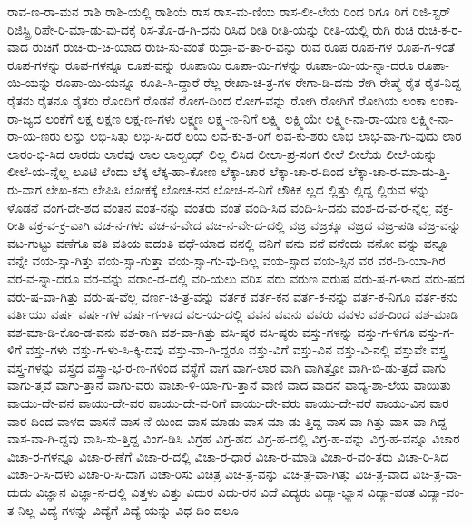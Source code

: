 {ರಾವ-ಣ-ರಾ-ಮನ
ರಾಶಿ
ರಾಶಿ-ಯಲ್ಲಿ
ರಾಶಿಯೆ
ರಾಸ
ರಾಸ-ಮ-ಣಿಯ
ರಾಸ-ಲೀ-ಲೆಯ
ರಿಂದ
ರಿಗೂ
ರಿಗೆ
ರಿಜಿ-ಸ್ಟರ್
ರಿಜಿಸ್ಟ್ರಿ
ರಿಪೇ-ರಿ-ಮಾ-ಡು-ವು-ದಕ್ಕೆ
ರಿಸ-ತೊ-ಡ-ಗಿ-ದನು
ರಿಸಿದ
ರೀತಿ
ರೀತಿ-ಯನ್ನು
ರೀತಿ-ಯಲ್ಲಿ
ರುಗಿ
ರುಚಿ
ರುಚಿ-ಕ-ರ-ವಾದ
ರುಚಿಗೆ
ರುಚಿ-ರು-ಚಿ-ಯಾದ
ರುಚಿ-ಸು-ವಂತೆ
ರುದ್ರಾ-ವ-ತಾ-ರ-ವನ್ನು
ರುವ
ರೂಪ
ರೂಪ-ಗಳ
ರೂಪ-ಗ-ಳಂತೆ
ರೂಪ-ಗಳನ್ನು
ರೂಪ-ಗಳನ್ನೂ
ರೂಪ-ವನ್ನು
ರೂಪಾಯಿ
ರೂಪಾ-ಯಿ-ಗಳನ್ನು
ರೂಪಾ-ಯಿ-ಯ-ನ್ನಾ-ದರೂ
ರೂಪಾ-ಯಿ-ಯನ್ನು
ರೂಪಾ-ಯಿ-ಯನ್ನೂ
ರೂಪಿ-ಸಿ-ದ್ದಾರೆ
ರೆಲ್ಲ
ರೇಖಾ-ಚಿ-ತ್ರ-ಗಳ
ರೇಗಾ-ಡಿ-ದನು
ರೇಗಿ
ರೇಷ್ಮೆ
ರೈತ
ರೈತ-ನಿದ್ದ
ರೈತನು
ರೈತನೂ
ರೈತರು
ರೊಂದಿಗೆ
ರೊಡನೆ
ರೋಗ-ದಿಂದ
ರೋಗ-ವನ್ನು
ರೋಗಿ
ರೋಗಿಗೆ
ರೋಗಿಯ
ಲಂಕಾ
ಲಂಕಾ-ರಾ-ಜ್ಯದ
ಲಂಕೆಗೆ
ಲಕ್ಷ
ಲಕ್ಷಣ
ಲಕ್ಷ-ಣ-ಗಳು
ಲಕ್ಷ್ಮಣ
ಲಕ್ಷ್ಮ-ಣ-ನಿಗೆ
ಲಕ್ಷ್ಮಿ
ಲಕ್ಷ್ಮಿಯೇ
ಲಕ್ಷ್ಮೀ-ನಾ-ರಾ-ಯಣ
ಲಕ್ಷ್ಮೀ-ನಾ-ರಾ-ಯ-ಣರು
ಲನ್ನು
ಲಭಿ-ಸಿತ್ತು
ಲಭಿ-ಸಿ-ದರೆ
ಲಯ
ಲವ-ಕು-ಶ-ರಿಗೆ
ಲವ-ಕು-ಶರು
ಲಾಭ
ಲಾಭ-ವಾ-ಗು-ವುದು
ಲಾರ
ಲಾರಂ-ಭಿ-ಸಿದ
ಲಾರದು
ಲಾರೆವು
ಲಾಲ
ಲಾಲ್ಬಂಧ್
ಲಿಲ್ಲ
ಲಿಸಿದ
ಲೀಲಾ-ಪ್ರ-ಸಂಗ
ಲೀಲೆ
ಲೀಲೆಯ
ಲೀಲೆ-ಯನ್ನು
ಲೀಲೆ-ಯ-ನ್ನೆಲ್ಲ
ಲೂಟಿ
ಲೆಂದು
ಲೆಕ್ಕ
ಲೆಕ್ಕ-ಹಾ-ಕೋಣ
ಲೆಕ್ಕಾ-ಚಾರ
ಲೆಕ್ಕಾ-ಚಾ-ರ-ದಿಂದ
ಲೆಕ್ಕಾ-ಚಾ-ರ-ಮಾ-ಡು-ತ್ತಿ-ರು-ವಾಗ
ಲೇಖ-ಕನು
ಲೇಪಿಸಿ
ಲೋಕಕ್ಕೆ
ಲೋಚ-ನನ
ಲೋಚ-ನ-ನಿಗೆ
ಲೌಕಿಕ
ಲ್ಲದ
ಲ್ಲಿತ್ತು
ಲ್ಲಿದ್ದ
ಲ್ಲಿರುವ
ಳನ್ನು
ಳೊಡನೆ
ವಂಗ-ದೇ-ಶದ
ವಂತನ
ವಂತ-ನನ್ನು
ವಂತರು
ವಂತೆ
ವಂದಿ-ಸಿದ
ವಂದಿ-ಸಿ-ದನು
ವಂಶ-ದ-ವ-ರ-ನ್ನೆಲ್ಲ
ವಕ್ರ-ರೀತಿ
ವಕ್ರ-ವ-ಕ್ರ-ವಾಗಿ
ವಚ-ನ-ಗಳು
ವಚ-ನ-ವೇದ
ವಚ-ನ-ವೇ-ದ-ದಲ್ಲಿ
ವಜ್ರ
ವಜ್ರಕ್ಕೂ
ವಜ್ರದ
ವಜ್ರ-ಪಡಿ
ವಜ್ರ-ವನ್ನು
ವಟ-ಗುಟ್ಟು
ವಣೆಗೂ
ವತಿ
ವತಿಯ
ವದಂತಿ
ವಧೆ-ಯಾದ
ವನಲ್ಲಿ
ವನಿಗೆ
ವನು
ವನೆ
ವನೆಂದು
ವನೋ
ವನ್ನು
ವನ್ನೂ
ವನ್ನೇ
ವಯ-ಸ್ಸಾ-ಗಿತ್ತು
ವಯ-ಸ್ಸಾ-ಗುತ್ತಾ
ವಯ-ಸ್ಸಾ-ಗು-ವು-ದಿಲ್ಲ
ವಯ-ಸ್ಸಾದ
ವಯ-ಸ್ಸಿನ
ವರ
ವರ-ದಿ-ಯಾ-ಗಿರ
ವರ-ವ-ನ್ನಾ-ದರೂ
ವರ-ವನ್ನು
ವರಾಂ-ಡ-ದಲ್ಲಿ
ವರಿ-ಯಲು
ವರಿಸ
ವರು
ವರುಣ
ವರುಷ
ವರು-ಷ-ಗ-ಳಾದ
ವರು-ಷದ
ವರು-ಷ-ವಾ-ಗಿತ್ತು
ವರು-ಷ-ವೆಲ್ಲ
ವರ್ಣ-ಚಿ-ತ್ರ-ವನ್ನು
ವರ್ತಕ
ವರ್ತ-ಕನ
ವರ್ತ-ಕ-ನನ್ನು
ವರ್ತ-ಕ-ನಿಗೂ
ವರ್ತ-ಕನು
ವರ್ತಿಯು
ವರ್ಷ
ವರ್ಷ-ಗಳ
ವರ್ಷ-ಗ-ಳಾದ
ವಲ-ಯ-ದಲ್ಲಿ
ವವನ
ವವನು
ವವರು
ವವಳು
ವಶ-ದಿಂದ
ವಶ-ಮಾಡಿ
ವಶ-ಮಾ-ಡಿ-ಕೊಂ-ಡ-ವನು
ವಶ-ರಾಗಿ
ವಶ-ವಾ-ಗಿತ್ತು
ವಸಿ-ಷ್ಠರ
ವಸಿ-ಷ್ಠರು
ವಸ್ತು-ಗಳನ್ನು
ವಸ್ತು-ಗ-ಳಿಗೂ
ವಸ್ತು-ಗ-ಳಿಗೆ
ವಸ್ತು-ಗಳು
ವಸ್ತು-ಗ-ಳು-ಸಿ-ಕ್ಕಿ-ದವು
ವಸ್ತು-ವಾ-ಗಿ-ದ್ದರೂ
ವಸ್ತು-ವಿಗೆ
ವಸ್ತು-ವಿನ
ವಸ್ತು-ವಿ-ನಲ್ಲಿ
ವಸ್ತುವೇ
ವಸ್ತ್ರ
ವಸ್ತ್ರ-ಗಳನ್ನು
ವಸ್ತ್ರದ
ವಸ್ತ್ರಾ-ಭ-ರ-ಣ-ಗಳಿಂದ
ವಸ್ಥೆಗೆ
ವಾಗ
ವಾಗ-ಲಾರ
ವಾಗಿ
ವಾಗಿತ್ತೋ
ವಾಗಿ-ಬಿ-ಡು-ತ್ತದೆ
ವಾಗು
ವಾಗು-ತ್ತವೆ
ವಾಗು-ತ್ತಾನೆ
ವಾಗು-ವರು
ವಾಚಾ-ಳಿ-ಯಾ-ಗು-ತ್ತಾನೆ
ವಾಣಿ
ವಾದ
ವಾದನೆ
ವಾದ್ಯ-ಶಾ-ಲೆಯ
ವಾಯಿತು
ವಾಯು-ದೇ-ವನೆ
ವಾಯು-ದೇ-ವರ
ವಾಯು-ದೇ-ವ-ರಿಗೆ
ವಾಯು-ದೇ-ವರು
ವಾಯು-ದೇ-ವರೆ
ವಾಯು-ವಿನ
ವಾರ
ವಾರ-ದಿಂದ
ವಾಳದ
ವಾಸನೆ
ವಾಸ-ನೆ-ಯಿಂದ
ವಾಸ-ಮಾಡು
ವಾಸ-ಮಾ-ಡು-ತ್ತಿದ್ದ
ವಾಸ-ವಾ-ಗಿತ್ತು
ವಾಸ-ವಾ-ಗಿದ್ದ
ವಾಸ-ವಾ-ಗಿ-ದ್ದವು
ವಾಸಿ-ಸು-ತ್ತಿದ್ದ
ವಿಂಗ-ಡಿಸಿ
ವಿಗ್ರಹ
ವಿಗ್ರ-ಹದ
ವಿಗ್ರ-ಹ-ದಲ್ಲಿ
ವಿಗ್ರ-ಹ-ವನ್ನು
ವಿಗ್ರ-ಹ-ವನ್ನೂ
ವಿಚಾರ
ವಿಚಾ-ರ-ಗಳನ್ನೂ
ವಿಚಾ-ರ-ಣೆಗೆ
ವಿಚಾ-ರ-ದಲ್ಲಿ
ವಿಚಾ-ರ-ಧಾರೆ
ವಿಚಾ-ರ-ಮಾಡಿ
ವಿಚಾ-ರ-ವಂ-ತರು
ವಿಚಾ-ರಿ-ಸಿದ
ವಿಚಾ-ರಿ-ಸಿ-ದಳು
ವಿಚಾ-ರಿ-ಸಿ-ದಾಗ
ವಿಚಾ-ರಿಸು
ವಿಚಿತ್ರ
ವಿಚಿ-ತ್ರ-ವನ್ನು
ವಿಚಿ-ತ್ರ-ವಾ-ಗಿತ್ತು
ವಿಚಿ-ತ್ರ-ವಾದ
ವಿಚಿ-ತ್ರ-ವಾ-ದುದು
ವಿಜ್ಞಾನ
ವಿಜ್ಞಾ-ನ-ದಲ್ಲಿ
ವಿತ್ತಳು
ವಿತ್ತು
ವಿದುರ
ವಿದು-ರನ
ವಿದೆ
ವಿದ್ಯರು
ವಿದ್ಯಾ-ಭ್ಯಾಸ
ವಿದ್ಯಾ-ವಂತ
ವಿದ್ಯಾ-ವಂ-ತ-ನಿಲ್ಲ
ವಿದ್ಯೆ-ಗಳನ್ನು
ವಿದ್ಯೆಗೆ
ವಿದ್ಯೆ-ಯನ್ನು
ವಿಧ-ದಿಂ-ದಲೂ
}
